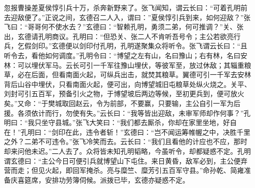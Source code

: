 忽报曹操差夏侯惇引兵十万，杀奔新野来了。张飞闻知，谓云长曰：“可着孔明前去迎敌便了。”正说之间，玄德召二人入，谓曰：”夏侯惇引兵到来，如何迎敌？”张飞曰：“哥哥何不使水去？”玄德曰：“智赖孔明，勇须二弟，何可推调？”关、张出，玄德请孔明商议。孔明曰：“但恐关、张二人不肯听吾号令；主公若欲亮行兵，乞假剑印。”玄德便以剑印付孔明，孔明遂聚集众将听令。张飞谓云长曰：“且听令去，看他如何调度。”孔明令曰：“博望之左有山，名曰豫山；右有林，名曰安林：可以埋伏军马。云长可引一千军往豫山埋伏，等彼军至，放过休敌；其辎重粮草，必在后面，但看南面火起，可纵兵出击，就焚其粮草。翼德可引一千军去安林背后山谷中埋伏，只看南面火起，便可出，向博望城旧屯粮草处纵火烧之。关平、刘封可引五百军，预备引火之物，于博望坡后两边等候，至初更兵到，便可放火矣。”又命：“于樊城取回赵云，令为前部，不要赢，只要输，主公自引一军为后援。各须依计而行，勿使有失。”云长曰：“我等皆出迎敌，未审军师却作何事？”孔明曰：“我只坐守县城。”张飞大笑曰：“我们都去厮杀，你却在家里坐地，好自在！”孔明曰：“剑印在此，违令者斩！”玄德曰：“岂不闻运筹帷幄之中，决胜千里之外？二弟不可违令。”张飞冷笑而去。云长曰：“我们且看他的计应也不应，那时却来问他未迟。”二人去了。众将皆未知孔明韬略，今虽听令，却都疑惑不定。孔明谓玄德曰：“主公今日可便引兵就博望山下屯住。来日黄昏，敌军必到，主公便弃营而走；但见火起，即回军掩杀。亮与糜竺、糜芳引五百军守县。”命孙乾、简雍准备庆喜筵席，安排功劳簿伺候。派拨已毕，玄德亦疑惑不定。

